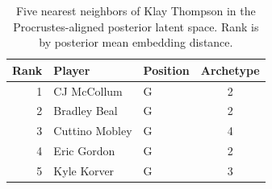 \begin{table}[htbp]
  \centering\small
  \begin{tabular}{rllc}
    \toprule
    Rank & Player & Position & Archetype \\
    \midrule
    1 & CJ McCollum & G & 2 \\
    2 & Bradley Beal & G & 2 \\
    3 & Cuttino Mobley & G & 4 \\
    4 & Eric Gordon & G & 2 \\
    5 & Kyle Korver & G & 3 \\
    \bottomrule
  \end{tabular}
  \caption{Five nearest neighbors of Klay Thompson in the Procrustes-aligned posterior latent space. Rank is by posterior mean embedding distance.}
  \label{tab:Klay_Thompson_neighbors}
\end{table}

